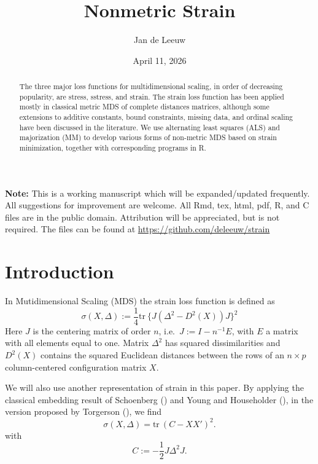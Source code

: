 \documentclass[
  12pt,
  letterpaper,
  DIV=11,
  numbers=noendperiod]{scrartcl}
\title{Nonmetric Strain}
\author{Jan de Leeuw}
\date{April 11, 2026}
\newcommand{\sectionbreak}{\clearpage}
\renewcommand*\contentsname{Table of contents}
\newcommand\contentsname{Table of contents}
\begin{document}
\maketitle
\begin{abstract}
The three major loss functions for multidimensional scaling, in order of
decreasing popularity, are stress, sstress, and strain. The strain loss
function has been applied mostly in classical metric MDS of complete
distances matrices, although some extensions to additive constants,
bound constraints, missing data, and ordinal scaling have been discussed
in the literature. We use alternating least squares (ALS) and
majorization (MM) to develop various forms of non-metric MDS based on
strain minimization, together with corresponding programs in R.
\end{abstract}

\renewcommand*\contentsname{Table of contents}
{
\setcounter{tocdepth}{3}
\tableofcontents
}

\sectionbreak

\textbf{Note:} This is a working manuscript which will be
expanded/updated frequently. All suggestions for improvement are
welcome. All Rmd, tex, html, pdf, R, and C files are in the public
domain. Attribution will be appreciated, but is not required. The files
can be found at \url{https://github.com/deleeuw/strain}

\sectionbreak

\section{Introduction}\label{introduction}

In Mutidimensional Scaling (MDS) the strain loss function is defined as
\begin{equation}
\sigma(X,\Delta):=\frac14\text{tr}\ \{J(\Delta^2-D^2(X))J\}^2\label{eq-strain}
\end{equation} Here \(J\) is the centering matrix of order \(n\),
i.e.~\(J:=I-n^{-1}E\), with \(E\) a matrix with all elements equal to
one. Matrix \(\Delta^2\) has squared dissimilarities and \(D^2(X)\)
contains the squared Euclidean distances between the rows of an
\(n\times p\) column-centered configuration matrix \(X\).

We will also use another representation of strain in this paper. By
applying the classical embedding result of Schoenberg
() and Young and Householder
(), in the version proposed by
Torgerson (), we find \begin{equation}
\sigma(X,\Delta)=\text{tr}\ (C- XX')^2.\label{eq-strainc}
\end{equation} with \begin{equation}
C:=-\frac12 J\Delta^2J.\label{eq-c}
\end{equation}
\end{document}
